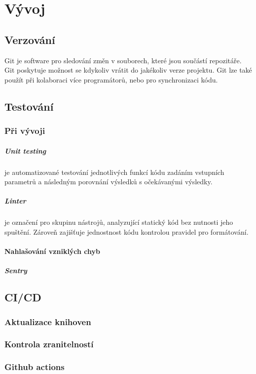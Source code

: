 \documentclass[12pt, a4paper,
 twoside,        %
 openright
]{report}
\begin{document}
\chapter{Vývoj}
\section{Verzování}
Git je software pro sledování změn v souborech, které jsou součástí repozitáře. Git poskytuje možnost se kdykoliv vrátit do jakékoliv verze projektu. Git lze také použít při kolaboraci více programátorů, nebo pro synchronizaci kódu.
\section{Testování}
\subsection{Při vývoji}  
\paragraph{Unit testing} je automatizované testování jednotlivých funkcí kódu zadáním vstupních parametrů a následným porovnání výsledků s očekávanými výsledky.
\paragraph{Linter} je označení pro skupinu nástrojů, analyzující statický kód bez nutnosti jeho spuštění. Zároveň zajišťuje jednostnost kódu kontrolou pravidel pro formátování. 
\subsubsection{Nahlašování vzniklých chyb}
\paragraph{Sentry}


 

\section{CI/CD}
\subsection{Aktualizace knihoven}
\subsection{Kontrola zranitelností}
\subsection{Github actions} 




 
\end{document}
